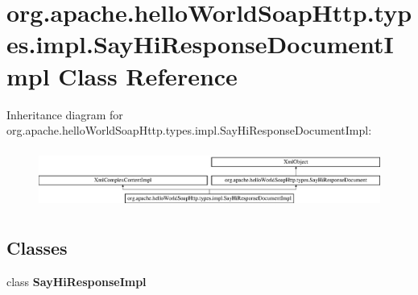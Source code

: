 \hypertarget{classorg_1_1apache_1_1hello_world_soap_http_1_1types_1_1impl_1_1_say_hi_response_document_impl}{}\section{org.\+apache.\+hello\+World\+Soap\+Http.\+types.\+impl.\+Say\+Hi\+Response\+Document\+Impl Class Reference}
\label{classorg_1_1apache_1_1hello_world_soap_http_1_1types_1_1impl_1_1_say_hi_response_document_impl}
Inheritance diagram for org.\+apache.\+hello\+World\+Soap\+Http.\+types.\+impl.\+Say\+Hi\+Response\+Document\+Impl\+:\begin{figure}[H]
\begin{center}
\leavevmode
\includegraphics[height=1.948956cm]{classorg_1_1apache_1_1hello_world_soap_http_1_1types_1_1impl_1_1_say_hi_response_document_impl}
\end{center}
\end{figure}
\subsection*{Classes}
\begin{DoxyCompactItemize}
\item 
class {\bfseries Say\+Hi\+Response\+Impl}
\end{DoxyCompactItemize}
